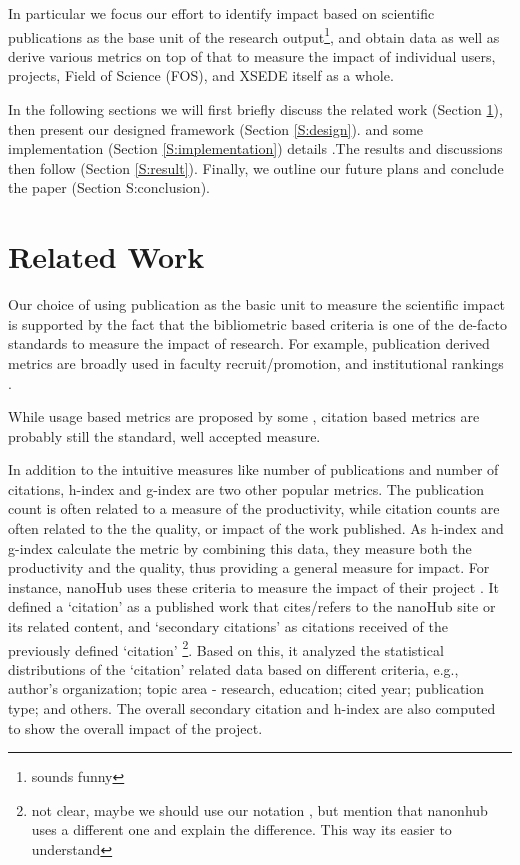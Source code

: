 \documentclass{sig-alternate}
\begin{document}
In particular we focus our effort to identify impact based on scientific publications as the base unit of the research output\footnote{sounds funny}, and obtain data as well as derive various metrics on top of that to measure the impact of individual users, projects, Field of Science (FOS), and XSEDE itself as a whole. 
 
In the following sections we will first briefly discuss the related work (Section \ref{S:related}), then present our designed framework (Section \ref{S:design}). and some implementation (Section \ref{S:implementation}) details .The results and discussions then follow (Section \ref{S:result}). Finally, we outline our future plans and conclude the paper (Section {S:conclusion}). 
 
 
 
\section{Related Work} \label{S:related}
 
Our choice of using publication as the basic unit to measure the scientific impact is supported by the fact that the bibliometric based criteria is one of the de-facto standards to measure the impact of research. For example, publication derived metrics are broadly used in faculty recruit/promotion, and institutional rankings \cite{thomas1998institutional}. 
 
While usage based metrics are proposed by some \cite{Bollen:2007:MUM:1255175.1255273,Bollen:2008:TUI:1378889.1378928, bollen2009principal}, citation based metrics are probably still the standard, well accepted measure. 

In addition to the intuitive measures like number of publications and number of citations, h-index \cite{hirsch2005index} and g-index \cite{egghe2006theory} are two other popular metrics. The publication count is often related to a measure of the productivity, while citation counts are often related to the the quality, or impact of the work published. As h-index and g-index calculate the metric by combining this data, they measure both the productivity and the quality, thus providing a general measure for impact. For instance, nanoHub uses these criteria to measure the impact of their project \cite{www-nanohubcite}. It defined a `citation' as a published work that cites/refers to the nanoHub site or its related content, and `secondary citations' as citations received of the previously defined `citation' \footnote{not clear, maybe we should use our notation , but mention that nanonhub uses a different one and explain the difference. This way its easier to understand}. Based on this, it analyzed the statistical distributions of the `citation' related data based on different criteria, e.g., author's organization; topic area - research, education; cited year; publication type; and others. The overall secondary citation and h-index are also computed to show the overall impact of the project. 
 
\end{document}
